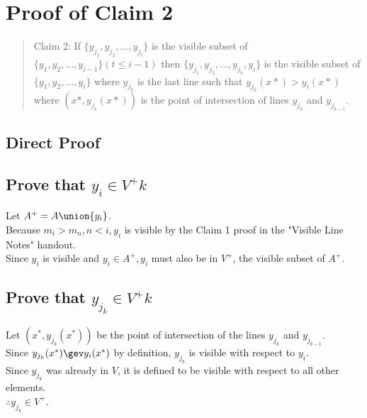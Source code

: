 \documentclass{article}
\begin{document}
\section*{Proof of Claim 2}

\begin{quote}
Claim 2: If $\{y_{j_1}, y_{j_2},...,y_{j_{t}}\}$ is the visible subset of $\{y_1, y_2,...,y_{i - 1}\} (t \leq i - 1)$ then $\{y_{j_1}, y_{j_2},...,y_{j_{k}}, y_i\}$ is the visible subset of $\{y_1, y_2,...,y_{i}\}$ where $y_{j_{k}}$ is the last line such that $y_{j_{k}} (x*) > y_i (x*)$ where $(x*, y_{j_{k}}(x*))$ is the point of intersection of lines $y_{j_{k}}$ and $y_{j_{k - 1}}$.
\end{quote}

\subsection*{Direct Proof}

\subsection{Prove that $y_{i} \in V^+k$}
Let $A^+ = A \union \{y_i\}$.\\
Because $m_i > m_n, n < i, y_i$ is visible by the Claim 1 proof in the "Visible Line Notes" handout.\\
Since $y_i$ is visible and $y_i \in A^+, y_i$ must also be in $V^+$, the visible subset of $A^+$.

\subsection{Prove that $y_{j_k} \in V^+k$}
Let $(x^*, y_{j_k} (x^*))$ be the point of intersection of the lines $y_{j_k}$ and $y_{j_{k-1}}$.\\
Since $y_{j_k} (x^*) \gev y_i (x^*)$ by definition, $y_{j_k}$ is visible with respect to $y_i$.\\
Since $y_{j_k}$ was already in $V$, it is defined to be visible with respect to all other elements.\\
$\therefore y_{j_k} \in V^+$.
\end{document}
